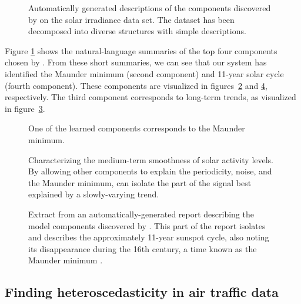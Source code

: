 \begin{figure}[h]
\centering
{}
\caption{
Automatically generated descriptions of the components discovered by \procedurename{} on the solar irradiance data set.
The dataset has been decomposed into diverse structures with simple descriptions.}
\label{fig:exec}
\end{figure}
Figure \ref{fig:exec} shows the natural-language summaries of the top four components chosen by \procedurename{}.
From these short summaries, we can see that our system has identified the Maunder minimum (second component) and 11-year solar cycle (fourth component).
These components are visualized in figures~\ref{fig:maunder} and \ref{fig:periodic}, respectively. 
The third component corresponds to long-term trends, as visualized in figure~\ref{fig:smooth}.

\begin{figure}[ht]
\centering
{}
\caption{One of the learned components corresponds to the Maunder minimum.}
\label{fig:maunder}
\end{figure}

\begin{figure}[h!]
\centering
{}
\caption{Characterizing the medium-term smoothness of solar activity levels.  By allowing other components to explain the periodicity, noise, and the Maunder minimum, \procedurename{} can isolate the part of the signal best explained by a slowly-varying trend.}
\label{fig:smooth}
\end{figure}

\begin{figure}[ht]
\centering
{}
\caption{
Extract from an automatically-generated report describing the model components discovered by \procedurename{}.
This part of the report isolates and describes the approximately 11-year sunspot cycle, also noting its disappearance during the 16th century, a time known as the Maunder minimum \citep{Lean1995-vp}.
}
\label{fig:periodic}
\end{figure}

\subsection{Finding heteroscedasticity in air traffic data}
\label{sec:airline}

